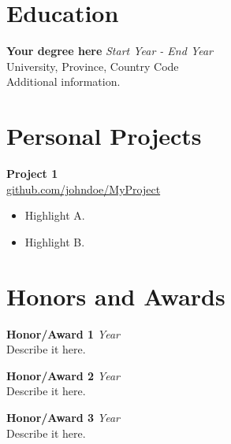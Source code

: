 \documentclass[a4paper,10pt]{article}
\newcommand{\sectiontitle}[1]{\section*{#1}}
\begin{document}
\vspace{0.5cm}

\sectiontitle{Education}

\noindent
\textbf{Your degree here} \hfill \textit{Start Year - End Year}\\
University, Province, Country Code\\
Additional information.

\vspace{0.5cm}

\sectiontitle{Personal Projects}

\noindent
\textbf{Project 1} \\
\href{https://github.com/johndoe}{github.com/johndoe/MyProject} \\
\begin{itemize}[left=0pt]
    \item Highlight A.
    \item Highlight B.
\end{itemize}

\vspace{0.5cm}


\sectiontitle{Honors and Awards}

\noindent
\textbf{Honor/Award 1} \hfill \textit{Year}\\
Describe it here.

\vspace{0.3cm}

\noindent
\textbf{Honor/Award 2} \hfill \textit{Year}\\
Describe it here.

\vspace{0.3cm}

\noindent
\textbf{Honor/Award 3} \hfill \textit{Year}\\
Describe it here.
\end{document}
